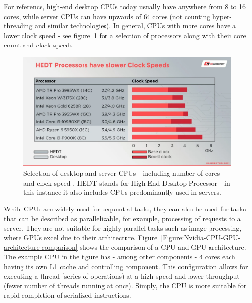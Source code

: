 \par For reference, high-end desktop CPUs today usually have anywhere from 8 to 16 cores, while server CPUs can have upwards of 64 cores (not counting hyper-threading and similar technologies). In general, CPUs with more cores have a lower clock speed - see figure~\ref{Figure:processor-comparison} for a selection of processors along with their core count and clock speeds \cite{Glawion7March2022}.

\begin{figure}[H]
	\centering
	\includegraphics[width=14cm, keepaspectratio]{images/ch1/processors_comparison.png}
	\caption{Selection of desktop and server CPUs - including number of cores and clock speed \cite{Glawion7March2022}. HEDT stands for High-End Desktop Processor - in this instance it also includes CPUs predominantly used in servers.}
	\label{Figure:processor-comparison}
\end{figure}

While CPUs are widely used for sequential tasks, they can also be used for tasks that can be described as parallelizable, for example, processing of requests to a server. They are not suitable for highly parallel tasks such as image processing, where GPUs excel due to their architecture. Figure~\ref{Figure:Nvidia-CPU-GPU-architecture-comparison} shows the comparison of a CPU and GPU architecture. The example CPU in the figure has - among other components - 4 cores each having its own L1 cache and controlling component. This configuration allows for executing a thread (series of operations) at a high speed and lower throughput (fewer number of threads running at once). Simply, the CPU is more suitable for rapid completion of serialized instructions.

